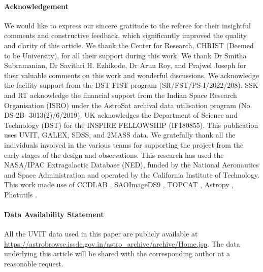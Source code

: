 \documentclass{pas}
\begin{document}
\paragraph{Acknowledgement}
{We would like to express our sincere gratitude to the referee for their insightful comments and constructive feedback, which significantly improved the quality and clarity of this article.} We thank the Center for Research, CHRIST (Deemed to be University), for all their support during this work. We thank Dr Smitha Subramanian, Dr Savithri H. Ezhikode, Dr Arun Roy, and Prajwel Joseph for their valuable comments on this work and wonderful discussions. We acknowledge the facility support from the DST FIST program (SR/FST/PS-I/2022/208). SSK and RT acknowledge the financial support from the Indian Space Research Organisation (ISRO) under the AstroSat archival data utilisation program (No. DS-2B- 3013(2)/6/2019). UK acknowledges the Department of Science and Technology (DST) for the INSPIRE FELLOWSHIP (IF180855). This publication uses UVIT, GALEX, SDSS, and 2MASS data. We gratefully thank all the individuals involved in the various teams for supporting the project from the early stages of the design and observations. This research has used the NASA/IPAC Extragalactic Database (NED), funded by the National Aeronautics and Space Administration and operated by the California Institute of Technology.  This work made use of  CCDLAB \citep{postma_uvit2017}, SAOImageDS9 \citep{2003Joyeds9}, TOPCAT \citep{2005Taylortopcat}, Astropy \citep{2013Astropy,2018Astopy}, Photutils \citep{larry_bradley_2023_Photutils}.

\paragraph{Data Availability Statement}
   All the UVIT data used in this paper are publicly available at \url{https://astrobrowse.issdc.gov.in/astro_archive/archive/Home.jsp}.  The data underlying this article will be shared with the corresponding author at a reasonable request. 
    
\end{document}
